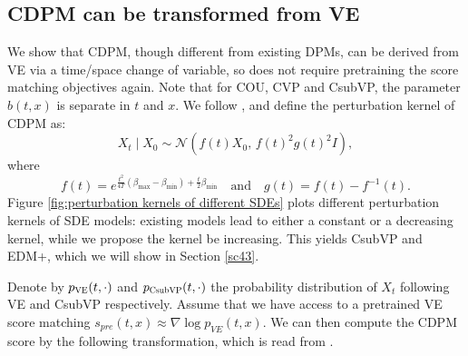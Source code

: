 \documentclass[letterpaper,10pt,reqno]{amsart}
\numberwithin{equation}{section}
\begin{document}
\subsection{CDPM can be transformed from VE}
We show that CDPM, though different from existing DPMs,
can be derived from VE via a time/space change of variable, 
so does not require pretraining the score matching objectives again. 
Note that for COU, CVP and CsubVP, 
the parameter $b(t,x)$ is separate in $t$ and $x$.
We follow \cite{karras2022elucidating},
and define the perturbation kernel of CDPM as:
\begin{equation*}
X_t \mid X_0\sim \mathcal{N}\left(f(t) X_0,\, f(t)^2 g(t)^2 I\right),
\end{equation*}
where 
\begin{equation}
f(t)=e^{\frac{t^2}{4T}(\beta_{\max} - \beta_{\min}) + \frac{t}{2} \beta_{\min}} \quad \text{and} \quad g(t)=f(t)-f^{-1}(t).
\end{equation}
Figure \ref{fig:perturbation kernels of different SDEs} plots
different perturbation kernels of SDE models:
existing models lead to either a constant or a decreasing kernel,
while we propose the kernel be increasing.
This yields CsubVP and EDM+, 
which we will show in Section \ref{sc43}.

\quad Denote by $p_{\scalebox{0.7}{VE}}(t,\cdot)$ and $p_{\scalebox{0.7}{CsubVP}}(t,\cdot)$ 
the probability distribution of $X_t$ following VE and CsubVP respectively.
Assume that we have access to a pretrained VE score matching
$s_{pre}(t,x)\approx \nabla \log p_{VE}(t,x)$.
We can then compute the CDPM score by the following transformation,
which is read from \cite[Equation (12) and (19)]{karras2022elucidating}.
\end{document}
